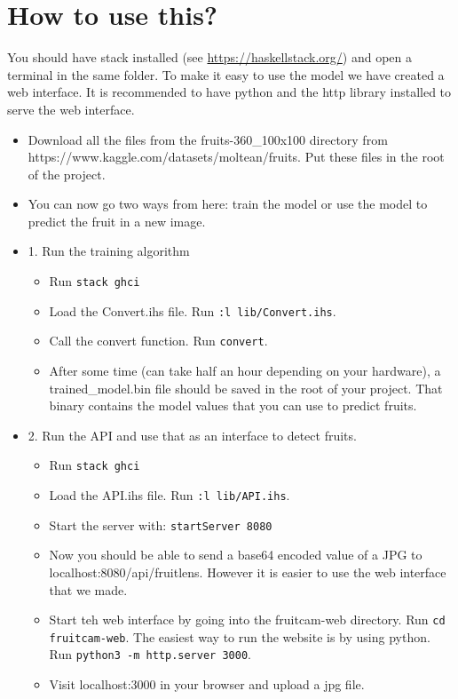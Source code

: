 \section{How to use this?}

You should have stack installed (see \url{https://haskellstack.org/}) and open a terminal in the same folder.
To make it easy to use the model we have created a web interface. It is recommended to have python and the http library installed to serve the web interface.

\begin{itemize}
  \item Download all the files from the fruits-360\_100x100 directory from\\ https://www.kaggle.com/datasets/moltean/fruits. Put these files in the root of the project.
  \item You can now go two ways from here: train the model or use the model to predict the fruit in a new image.
  \item 1. Run the training algorithm
  \begin{itemize}
      \item Run \verb|stack ghci| 
      \item Load the Convert.ihs file. Run \verb|:l lib/Convert.ihs|. 
      \item Call the convert function. Run \verb|convert|.
      \item After some time (can take half an hour depending on your hardware), a trained\_model.bin file should be saved in the root of your project. That binary contains the model values that you can use to predict fruits.
  \end{itemize}

  \item 2. Run the API and use that as an interface to detect fruits.
  \begin{itemize}
    \item Run \verb |stack ghci|
    \item Load the API.ihs file. Run \verb|:l lib/API.ihs|.
    \item Start the server with: \verb|startServer 8080|
    \item Now you should be able to send a base64 encoded value of a JPG to localhost:8080/api/fruitlens. However it is easier to use the web interface that we made.
    \item Start teh web interface by going into the fruitcam-web directory. Run \verb|cd fruitcam-web|. The easiest way to run the website is by using python. Run \verb|python3 -m http.server 3000|.
    \item Visit localhost:3000 in your browser and upload a jpg file.
  \end{itemize}
\end{itemize}

